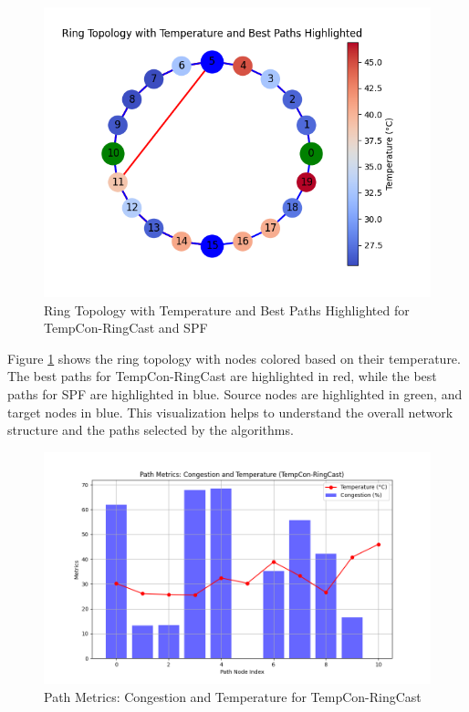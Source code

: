 \documentclass[conference]{IEEEtran}
\begin{document}
\begin{figure}[h]
    \centering
    \includegraphics[width=\linewidth]{ring_topology_comparison.png}
    \caption{Ring Topology with Temperature and Best Paths Highlighted for TempCon-RingCast and SPF}
    \label{fig:ring_topology_comparison}
\end{figure}

Figure \ref{fig:ring_topology_comparison} shows the ring topology with nodes colored based on their temperature. The best paths for TempCon-RingCast are highlighted in red, while the best paths for SPF are highlighted in blue. Source nodes are highlighted in green, and target nodes in blue. This visualization helps to understand the overall network structure and the paths selected by the algorithms.

\begin{figure}[h]
    \centering
    \includegraphics[width=\linewidth]{path_metrics_TempCon-RingCast.png}
    \caption{Path Metrics: Congestion and Temperature for TempCon-RingCast}
    \label{fig:path_metrics_tempcon}
\end{figure}
\end{document}
